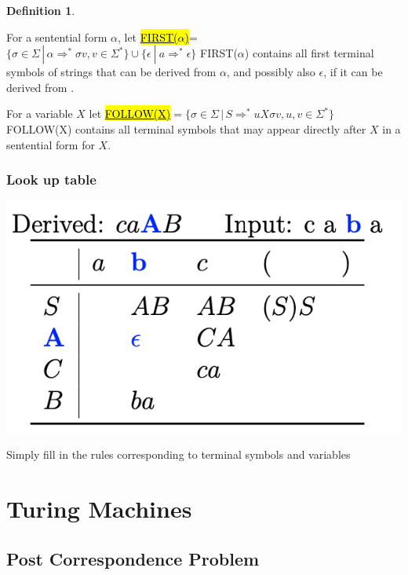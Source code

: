 \documentclass[a3paper, 8pt]{extarticle}
\newtheorem*{definition}{Definition}
\begin{document}
\begin{multicols*}{6}
\begin{definition}
\end{definition}

For a sentential form $\alpha$, let \underline{\hl{FIRST($\alpha$)}}= \\ $\{ \sigma \in \Sigma \, | \, \alpha \Rightarrow^* \sigma v, v \in \Sigma ^* \} \cup \{ \epsilon \: | \: a \Rightarrow^* \epsilon \} $ {FIRST}($\alpha$) contains all first terminal symbols of strings that can be derived from $\alpha$, and possibly also $\epsilon$, if it can be derived from \alpha.

For a variable $X$ let \underline{\hl{FOLLOW(X)}}$=\{ \sigma \in \Sigma \, | \, S \Rightarrow^* uX\sigma v, u, v \in \Sigma ^* \}$ FOLLOW(X) contains all terminal symbols that may appear directly after $X$ in a sentential form for $X$.
\subsubsection{Look up table}
\begin{center}
\includegraphics[width=0.6\columnwidth]{images/Screen Shot 2023-01-12 at 13.51.21.png}
\end{center}
Simply fill in the rules corresponding to terminal symbols and variables


\section{Turing Machines}

\subsection*{Post Correspondence Problem} 


\end{multicols*}
\end{document}
